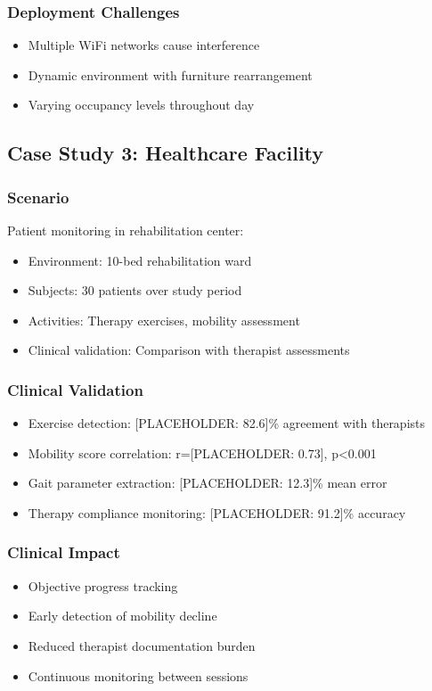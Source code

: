 \documentclass[journal]{IEEEtran}
\begin{document}
\subsubsection{Deployment Challenges}
\begin{itemize}
\item Multiple WiFi networks cause interference
\item Dynamic environment with furniture rearrangement
\item Varying occupancy levels throughout day
\end{itemize}

\subsection{Case Study 3: Healthcare Facility}

\subsubsection{Scenario}
Patient monitoring in rehabilitation center:
\begin{itemize}
\item Environment: 10-bed rehabilitation ward
\item Subjects: 30 patients over study period
\item Activities: Therapy exercises, mobility assessment
\item Clinical validation: Comparison with therapist assessments
\end{itemize}

\subsubsection{Clinical Validation}
\begin{itemize}
\item Exercise detection: [PLACEHOLDER: 82.6]\% agreement with therapists
\item Mobility score correlation: r=[PLACEHOLDER: 0.73], p<0.001
\item Gait parameter extraction: [PLACEHOLDER: 12.3]\% mean error
\item Therapy compliance monitoring: [PLACEHOLDER: 91.2]\% accuracy
\end{itemize}

\subsubsection{Clinical Impact}
\begin{itemize}
\item Objective progress tracking
\item Early detection of mobility decline
\item Reduced therapist documentation burden
\item Continuous monitoring between sessions
\end{itemize}
\end{document}
